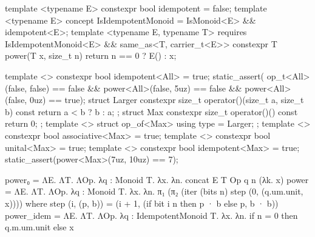 \begin{listing}[tp]
\vspace{-7pt}
\begin{minipage}[t]{0.48\linewidth}
\begin{cpp}
template <typename E>
constexpr bool idempotent = false;
template <typename E>
concept IsIdempotentMonoid =
  IsMonoid<E> && idempotent<E>;
template <typename E, typename T>
  requires IsIdempotentMonoid<E> &&
           same_as<T, carrier_t<E>>
constexpr T power(T x, size_t n) {
  return n == 0 ? E{}() : x; }
\end{cpp}
\end{minipage}\hspace{0.04\linewidth}%
\begin{minipage}[t]{0.48\linewidth}
\begin{cpp}
template <> constexpr bool
idempotent<All> = true;
static_assert(
op_t<All>{}(false, false) == false &&
power<All>(false, 5uz) == false &&
power<All>(false, 0uz) == true);
struct Larger { constexpr size_t
  operator()(size_t a, size_t b) const {
    return a < b ? b : a; } };
struct Max { constexpr size_t
  operator()() const { return 0; } };
template <> struct op_of<Max> {
  using type = Larger; };
template <> constexpr bool
associative<Max> = true;
template <> constexpr bool
unital<Max> = true;
template <> constexpr bool
idempotent<Max> = true;
static_assert(power<Max>(7uz, 10uz) == 7);
\end{cpp}
\end{minipage}
\vspace{-7pt}
\begin{sysf}
power₀ = ΛE. ΛT. ΛOp. λq : Monoid T. λx. λn. concat E T Op q n (λk. x)
power = ΛE. ΛT. ΛOp. λq : Monoid T. λx. λn.
  π₁ (π₂ (iter (bits n) step (0, (q.um.unit, x))))
  where step (i, (p, b)) = (i + 1, (if bit i n then p · b else p, b · b))
power_idem = ΛE. ΛT. ΛOp. λq : IdempotentMonoid T. λx. λn.
  if n = 0 then q.m.um.unit else x
\end{sysf}
\caption{What a law permits: the power of a monoid.
Left: the power by repeated squaring, and a case of it that a law selects.
Right: tests. Below: the images, $\cdot$ the monoid's operation.}
\label{lst:power}
\end{listing}

